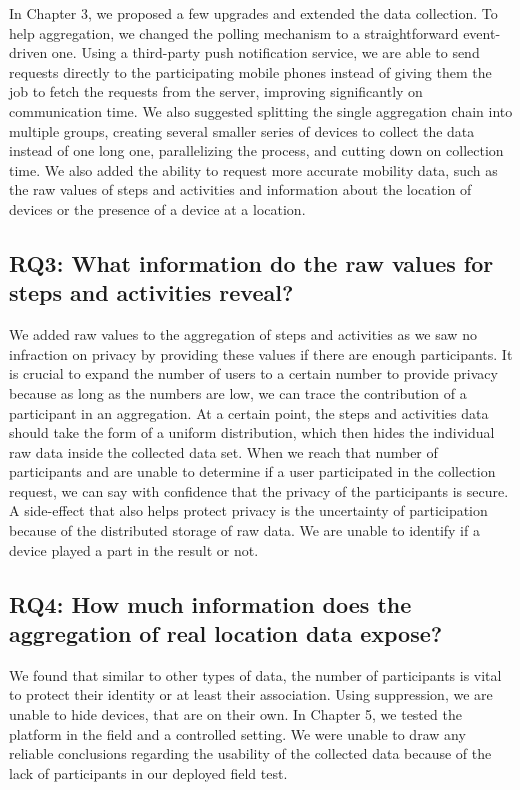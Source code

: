 In Chapter 3, we proposed a few upgrades and extended the data collection. To help aggregation, we changed the polling mechanism to a straightforward event-driven one. Using a third-party push notification service, we are able to send requests directly to the participating mobile phones instead of giving them the job to fetch the requests from the server, improving significantly on communication time. We also suggested splitting the single aggregation chain into multiple groups, creating several smaller series of devices to collect the data instead of one long one, parallelizing the process, and cutting down on collection time. We also added the ability to request more accurate mobility data, such as the raw values of steps and activities and information about the location of devices or the presence of a device at a location. 

\subsection*{RQ3: What information do the raw values for steps and activities reveal?}
We added raw values to the aggregation of steps and activities as we saw no infraction on privacy by providing these values if there are enough participants. It is crucial to expand the number of users to a certain number to provide privacy because as long as the numbers are low, we can trace the contribution of a participant in an aggregation. At a certain point, the steps and activities data should take the form of a uniform distribution, which then hides the individual raw data inside the collected data set. When we reach that number of participants and are unable to determine if a user participated in the collection request, we can say with confidence that the privacy of the participants is secure. A side-effect that also helps protect privacy is the uncertainty of participation because of the distributed storage of raw data. We are unable to identify if a device played a part in the result or not.

\subsection*{RQ4: How much information does the aggregation of real location data expose?}
We found that similar to other types of data, the number of participants is vital to protect their identity or at least their association. Using suppression, we are unable to hide devices, that are on their own. In Chapter 5, we tested the platform in the field and a controlled setting. We were unable to draw any reliable conclusions regarding the usability of the collected data because of the lack of participants in our deployed field test.


